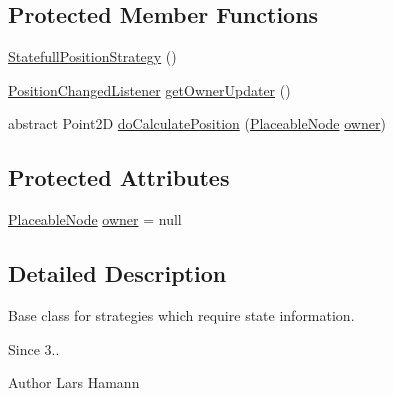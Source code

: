 \subsection*{Protected Member Functions}
\begin{DoxyCompactItemize}
\item 
\hyperlink{classorg_1_1tzi_1_1use_1_1gui_1_1views_1_1diagrams_1_1elements_1_1positioning_1_1_statefull_position_strategy_a9b6e9f337ffa2d1f89a4661e833e9b50}{Statefull\-Position\-Strategy} ()
\item 
\hyperlink{interfaceorg_1_1tzi_1_1use_1_1gui_1_1views_1_1diagrams_1_1_position_changed_listener}{Position\-Changed\-Listener} \hyperlink{classorg_1_1tzi_1_1use_1_1gui_1_1views_1_1diagrams_1_1elements_1_1positioning_1_1_statefull_position_strategy_a0a74637a4e424fb8dd171993dfd17a45}{get\-Owner\-Updater} ()
\item 
abstract Point2\-D \hyperlink{classorg_1_1tzi_1_1use_1_1gui_1_1views_1_1diagrams_1_1elements_1_1positioning_1_1_statefull_position_strategy_a2aec1109d05b52f60a2d250ce7a202a5}{do\-Calculate\-Position} (\hyperlink{classorg_1_1tzi_1_1use_1_1gui_1_1views_1_1diagrams_1_1elements_1_1_placeable_node}{Placeable\-Node} \hyperlink{classorg_1_1tzi_1_1use_1_1gui_1_1views_1_1diagrams_1_1elements_1_1positioning_1_1_statefull_position_strategy_ac987ea0c7e5b6ddc09cc5afb41043dfd}{owner})
\end{DoxyCompactItemize}
\subsection*{Protected Attributes}
\begin{DoxyCompactItemize}
\item 
\hyperlink{classorg_1_1tzi_1_1use_1_1gui_1_1views_1_1diagrams_1_1elements_1_1_placeable_node}{Placeable\-Node} \hyperlink{classorg_1_1tzi_1_1use_1_1gui_1_1views_1_1diagrams_1_1elements_1_1positioning_1_1_statefull_position_strategy_ac987ea0c7e5b6ddc09cc5afb41043dfd}{owner} = null
\end{DoxyCompactItemize}


\subsection{Detailed Description}
Base class for strategies which require state information. \begin{DoxySince}{Since}
3.. 
\end{DoxySince}
\begin{DoxyAuthor}{Author}
Lars Hamann 
\end{DoxyAuthor}


